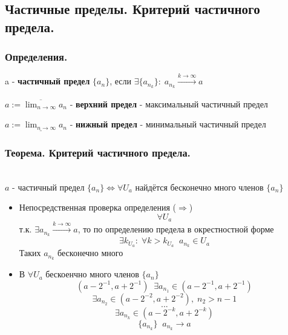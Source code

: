 \subsection{Частичные пределы. Критерий частичного предела.}

\subsubsection*{Определения.}
a - \textbf{частичный предел} $\{a_n\}$, если $\exists \{a_{n_k}\}:\; a_{n_k} \xrightarrow[]{k \to \infty} a$

$a:= \overline{\lim_{n\to\infty}} a_n$ - \textbf{верхний предел} - максимальный частичный предел

$a:= \underline{\lim_{n\to\infty}} a_n$ - \textbf{нижный предел} - минимальный частичный предел

\subsubsection*{Теорема. Критерий частичного предела.}\\ 
$a$ - частичный предел $\{a_n\} \Leftrightarrow \forall U_a$ найдётся бесконечно много членов $\{a_n\}$
\begin{tcolorbox}[title=Доказательство]
	\begin{itemize}
		\item Непосредственная проверка определения ($\Rightarrow$)
			\[ \forall U_a \]
			т.к. $\exists a_{n_k} \xrightarrow[]{k\to\infty} a$, то по определению предела в окрестностной форме
			\[ \exists k_{U_a}: \; \forall k > k_{U_a} \;\; a_{n_k} \in U_a\] 
			Таких $a_{n_k}$ бесконечно много
		\item В $\forall U_a$ бескоенчно много членов $\{a_n\}$ 
			\[ (a - 2^{-1}, a + 2^{-1})\;\; \exists a_{n_1} \in (a - 2^{-1}, a + 2^{-1}) \]
			\[ \exists a_{n_2} \in (a - 2^{-2}, a + 2^{-2}),\; n_2 > n-1 \]
			\[ ... \] 
			\[ \exists a_{n_k} \in (a - 2^{-k}, a + 2^{-k}) \]
			\[ \{a_{n_k}\} \;\; a_{n_k} \to a \]
	\end{itemize}
\end{tcolorbox}

